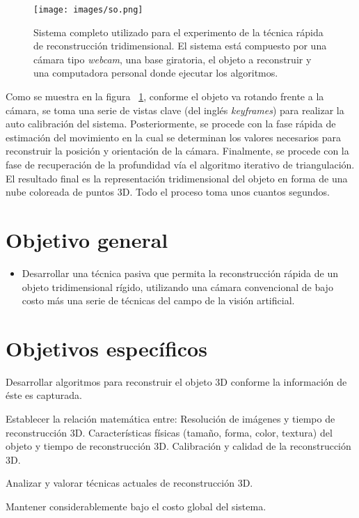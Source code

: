 \begin{figure}[H]
\centering
\texttt{[image: images/so.png]}
\caption[Sistema completo utilizado para el experimento de la t\'{e}cnica r\'{a}pida de reconstrucci\'{o}n tridimensional]%
{Sistema completo utilizado para el experimento de la t\'{e}cnica r\'{a}pida de reconstrucci\'{o}n tridimensional. El sistema est\'{a} compuesto por una c\'{a}mara tipo \textit{webcam}, una base giratoria, el objeto a reconstruir y una computadora personal donde ejecutar los algoritmos.}
\label{fig:SO}
\end{figure}


Como se muestra en la figura ~\ref{fig:SO}, conforme el objeto va rotando frente a la c\'{a}mara, se toma una serie de vistas clave (del ingl\'{e}s \textit{keyframes}) para realizar la auto calibraci\'{o}n del sistema. Posteriormente, se procede con la fase r\'{a}pida de estimaci\'{o}n del movimiento en la cual se determinan los valores necesarios para reconstruir la posici\'{o}n y orientaci\'{o}n de la c\'{a}mara. Finalmente, se procede con la fase de recuperaci\'{o}n de la profundidad v\'{i}a el algoritmo iterativo de triangulaci\'{o}n. El resultado final es la representaci\'{o}n tridimensional del objeto en forma de una nube coloreada de puntos 3D. Todo el proceso toma unos cuantos segundos.




\section{Objetivo general}
\begin{itemize}
\item Desarrollar una t\'{e}cnica pasiva que permita la reconstrucci\'{o}n r\'{a}pida de un objeto tridimensional r\'{i}gido, utilizando una c\'{a}mara convencional de bajo costo m\'{a}s una serie de t\'{e}cnicas del campo de la visi\'{o}n artificial.
\end{itemize}

\section{Objetivos espec\'{i}ficos}
\begin{itemize*}
\item Desarrollar algoritmos para reconstruir el objeto 3D conforme la informaci\'{o}n de \'{e}ste es capturada.
\item Establecer la relaci\'{o}n matem\'{a}tica entre:
\subitem Resoluci\'{o}n de im\'{a}genes y tiempo de reconstrucci\'{o}n 3D.
\subitem Caracter\'{i}sticas f\'{i}sicas (tamaño, forma, color, textura) del objeto y tiempo de reconstrucci\'{o}n 3D.
\subitem Calibraci\'{o}n y calidad de la reconstrucci\'{o}n 3D.
\item Analizar y valorar t\'{e}cnicas actuales de reconstrucci\'{o}n 3D.
\item Mantener considerablemente bajo el costo global del sistema.
\end{itemize*}

